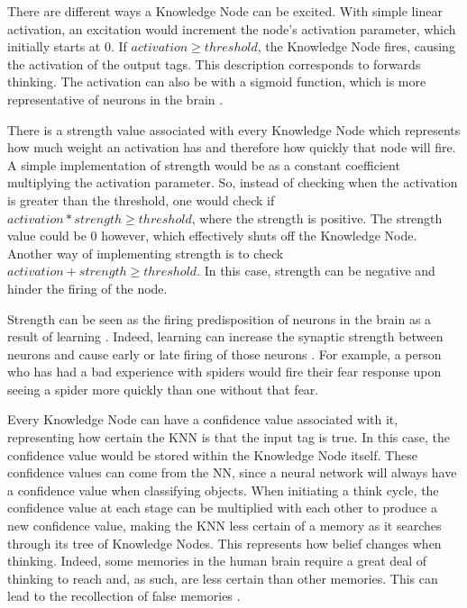 \documentclass[titlepage,11pt]{article}
\begin{document}
There are different ways a Knowledge Node can be excited. With simple linear activation, an excitation would increment the node's activation parameter, which initially starts at 0. If $activation \geq threshold$, the Knowledge Node fires, causing the activation of the output tags. This description corresponds to forwards thinking. The activation can also be with a sigmoid function, which is more representative of neurons in the brain \cite{neuro}.


There is a strength value associated with every Knowledge Node which represents how much weight an activation has and therefore how quickly that node will fire. A simple implementation of strength would be as a constant coefficient multiplying the activation parameter. So, instead of checking when the activation is greater than the threshold, one would check if $activation * strength \geq threshold$, where the strength is positive. The strength value could be 0 however, which effectively shuts off the Knowledge Node. Another way of implementing strength is to check $activation + strength \geq threshold$. In this case, strength can be negative and hinder the firing of the node.

Strength can be seen as the firing predisposition of neurons in the brain as a result of learning \cite{vybihal-knowledge}. Indeed, learning can increase the synaptic strength between neurons and cause early or late firing of those neurons \cite{hebb}. For example, a person who has had a bad experience with spiders would fire their fear response upon seeing a spider more quickly than one without that fear.

Every Knowledge Node can have a confidence value associated with it, representing how certain the KNN is that the input tag is true. In this case, the confidence value would be stored within the Knowledge Node itself. These confidence values can come from the NN, since a neural network will always have a confidence value when classifying objects. When initiating a think cycle, the confidence value at each stage can be multiplied with each other to produce a new confidence value, making the KNN less certain of a memory as it searches through its tree of Knowledge Nodes. This represents how belief changes when thinking. Indeed, some memories in the human brain require a great deal of thinking to reach and, as such, are less certain than other memories. This can lead to the recollection of false memories \cite{falsememories}.
\end{document}
